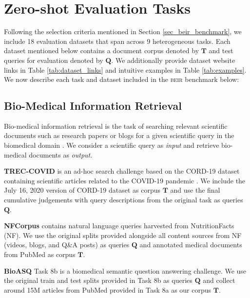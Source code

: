 \documentclass{article}
\newcommand{\custo}[1]{\textsc{\normalsize #1}}
\newcommand{\beir}{\custo{beir}\xspace}
\begin{document}
\vspace{-2mm}
\section{Zero-shot Evaluation Tasks}\label{sec:datasets}
\vspace{-2mm}

Following the selection criteria mentioned in Section \ref{sec_beir_benchmark}, we include 18 evaluation datasets that span across 9 heterogeneous tasks. Each dataset mentioned below contains a document corpus denoted by $\mathbf{T}$ and test queries for evaluation denoted by $\mathbf{Q}$. We additionally provide dataset website links in Table \ref{tab:dataset_links} and intuitive examples in Table \ref{tab:examples}. We now describe each task and dataset included in the \beir benchmark below:

\vspace{-2mm}
\subsection{Bio-Medical Information Retrieval}
\vspace{-2mm}
Bio-medical information retrieval is the task of searching relevant scientific documents such as research papers or blogs for a given scientific query in the biomedical domain \cite{jiang2007empirical}. We consider a scientific query as \textit{input} and retrieve bio-medical documents as \textit{output}.

\textbf{TREC-COVID} \cite{10.1145/3451964.3451965} is an ad-hoc search challenge based on the CORD-19 dataset containing scientific articles related to the COVID-19 pandemic \cite{wang2020cord19}. We include the July 16, 2020 version of CORD-19 dataset as corpus $\mathbf{T}$ and use the final cumulative judgements with query descriptions from the original task as queries $\mathbf{Q}$.

\textbf{NFCorpus} \cite{boteva2016} contains natural language queries harvested from NutritionFacts (NF). We use the original splits provided alongside all content sources from NF (videos, blogs, and Q\&A posts) as queries $\mathbf{Q}$ and annotated medical documents from PubMed as corpus $\mathbf{T}$.

\textbf{BioASQ} \cite{tsatsaronis2015overview} Task 8b is a biomedical semantic question answering challenge. We use the original train and test splits provided in Task 8b as queries $\mathbf{Q}$ and collect around 15M articles from PubMed provided in Task 8a as our corpus $\mathbf{T}$. 
\end{document}
